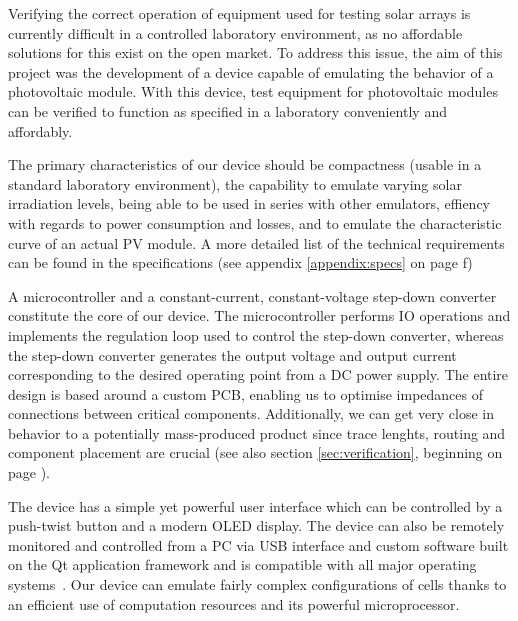 

Verifying the correct operation of equipment  used for testing solar arrays is
currently difficult in  a controlled laboratory environment,  as no affordable
solutions for this exist on the open market. To address this issue, the aim of
this project was the development of a device capable of emulating the behavior
of a  photovoltaic module. With this  device, test equipment  for photovoltaic
modules can be verified to function  as specified in a laboratory conveniently
and affordably.

The primary characteristics  of our device should be compactness  (usable in a
standard  laboratory environment),  the  capability to  emulate varying  solar
irradiation levels,  being able  to be  used in  series with  other emulators,
effiency with  regards to  power consumption  and losses,  and to  emulate the
characteristic  curve of  an actual  PV module. A  more detailed  list of  the
technical  requirements  can be  found  in  the specifications  (see  appendix
\ref{appendix:specs} on page \pageref{appendix:specs}f)

A microcontroller and a constant-current, constant-voltage step-down converter
constitute the core of our device.  The microcontroller performs IO operations
and implements  the regulation loop  used to control the  step-down converter,
whereas  the  step-down converter  generates  the  output voltage  and  output
current  corresponding  to  the  desired  operating  point  from  a  DC  power
supply. The  entire design  is  based  around a  custom  PCB,  enabling us  to
optimise impedances of  connections between critical components. Additionally,
we can get very close in behavior to a potentially mass-produced product since
trace lenghts, routing  and component placement are crucial  (see also section
\ref{sec:verification}, beginning on page \pageref{sec:verification}).

The device has a simple yet powerful user interface which can be controlled by
a push-twist button and a modern OLED display. The device can also be remotely
monitored and controlled from a PC via USB interface and custom software built
on the  Qt application framework  and is  compatible with all  major operating
systems~\cite{ref:qt}.  Our  device can emulate fairly  complex configurations
of cells thanks to an efficient  use of computation resources and its powerful
microprocessor.

